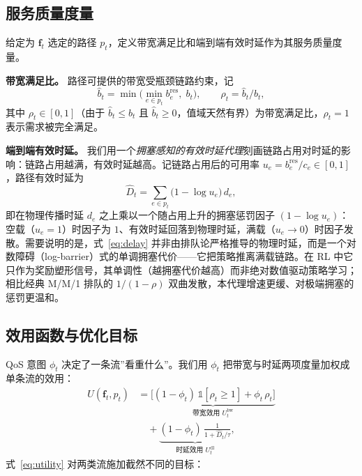 \subsection{服务质量度量}
\label{sec:problem:metrics}

给定为 $\mathbf{f}_t$ 选定的路径 $p_t$，定义带宽满足比和端到端有效时延作为其服务质量度量。

\textbf{带宽满足比。} 路径可提供的带宽受瓶颈链路约束，记
\begin{equation}
\hat b_t = \min\!\Big(\min_{e\in p_t} b_e^{\text{res}},\; b_t\Big),
\qquad
\rho_t = \hat b_t/b_t,
\label{eq:rho}
\end{equation}
其中 $\rho_t\in[0,1]$（由于 $\hat b_t\le b_t$ 且 $\hat b_t\ge 0$，值域天然有界）为带宽满足比，$\rho_t=1$ 表示需求被完全满足。

\textbf{端到端有效时延。} 我们用一个\emph{拥塞感知的有效时延代理}刻画链路占用对时延的影响：链路占用越满，有效时延越高。记链路占用后的可用率 $u_e = b_e^{\text{res}}/c_e\in[0,1]$，路径有效时延为
\begin{equation}
\hat D_t = \sum_{e\in p_t}\big(1-\log u_e\big)\, d_e,
\label{eq:delay}
\end{equation}
即在物理传播时延 $d_e$ 之上乘以一个随占用上升的拥塞惩罚因子 $(1-\log u_e)$：空载（$u_e\!=\!1$）时因子为 $1$、有效时延回落到物理时延，满载（$u_e\!\to\!0$）时因子发散。需要说明的是，式~\eqref{eq:delay} 并非由排队论严格推导的物理时延，而是一个对数障碍（log-barrier）式的单调拥塞代价——它把策略推离满载链路。在 RL 中它只作为奖励塑形信号，其单调性（越拥塞代价越高）而非绝对数值驱动策略学习；相比经典 M/M/1 排队的 $1/(1-\rho)$ 双曲发散，本代理增速更缓、对极端拥塞的惩罚更温和。

\subsection{效用函数与优化目标}
\label{sec:problem:objective}

QoS 意图 $\phi_t$ 决定了一条流”看重什么”。我们用 $\phi_t$ 把带宽与时延两项度量加权成单条流的效用：
\begin{equation}
\begin{split}
U(\mathbf{f}_t, p_t) &=
\underbrace{\big[(1-\phi_t)\,\mathbb{1}[\rho_t\!\ge\!1] + \phi_t\,\rho_t\big]}_{\text{带宽效用 }U^{\text{bw}}_t} \\
&\quad +
\underbrace{(1-\phi_t)\,\frac{1}{1+\hat D_t/\tau}}_{\text{时延效用 }U^{\text{dl}}_t},
\end{split}
\label{eq:utility}
\end{equation}
式~\eqref{eq:utility} 对两类流施加截然不同的目标：

